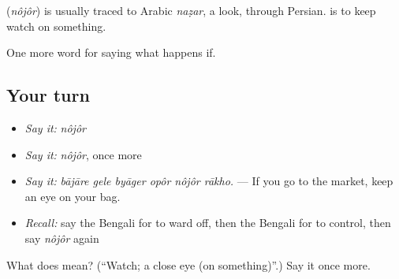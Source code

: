 \begin{cousinweb}
\textbf{} (\emph{nôjôr}) is usually traced to Arabic \emph{naẓar}, a look, through Persian.   is to keep watch on something.
\end{cousinweb}

\begin{grammarlens}[title={What you've built}]
One more word for saying what happens if.
\end{grammarlens}

\subsection*{Your turn}
\begin{itemize}
\raggedright
  \item \emph{Say it:} \emph{nôjôr}
  \item \emph{Say it:} \emph{nôjôr}, once more
  \item \emph{Say it:} \emph{bājāre gele byāger opôr nôjôr rākho.} — If you go to the market, keep an eye on your bag.
  \item \emph{Recall:} say the Bengali for to ward off, then the Bengali for to control, then say \emph{nôjôr} again
\end{itemize}

\begin{tcolorbox}[breakable,colback=teal!4,colframe=teal!35!black,title={Before you move on}]
What does  mean? (\textquotedblleft{}Watch; a close eye (on something)\textquotedblright{}.) Say it once more.
\end{tcolorbox}
